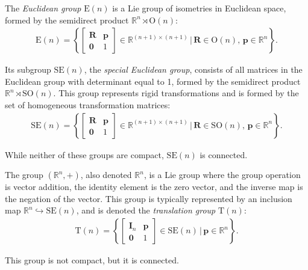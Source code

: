 \begin{example}\label{ex:euclidean-group-special-euclidean-group}
    The \emph{Euclidean group} $\text{E}(n)$ is a Lie group of isometries in Euclidean space, formed by the semidirect product $\mathbb{R}^n \rtimes \text{O}(n)$:
    \begin{align}
        \text{E}(n) = \left\{\begin{bmatrix}
            \mathbf{R} & \mathbf{p} \\ \mathbf{0} & 1
        \end{bmatrix} \in \mathbb{R}^{(n+1)\times(n+1)} \,\biggl|\, \mathbf{R}\in\text{O}(n),\, \mathbf{p}\in\mathbb{R}^n\right\}.
    \end{align}

    Its subgroup $\text{SE}(n)$, the \emph{special Euclidean group}, consists of all matrices in the Euclidean group with determinant equal to 1, formed by the semidirect product $\mathbb{R}^n\rtimes \text{SO}(n)$. This group represents rigid transformations and is formed by the set of homogeneous transformation matrices:
    \begin{align}
        \text{SE}(n) = \left\{\begin{bmatrix}
            \mathbf{R} & \mathbf{p} \\ \mathbf{0} & 1
        \end{bmatrix} \in \mathbb{R}^{(n+1)\times(n+1)} \,\biggl|\, \mathbf{R}\in\text{SO}(n),\, \mathbf{p}\in\mathbb{R}^n\right\}.
    \end{align}

    While neither of these groups are compact, $\text{SE}(n)$ is connected.
\end{example}
\begin{example}\label{ex:translation-group}
    The group $(\mathbb{R}^n,+)$, also denoted $\mathbb{R}^n$, is a Lie group where the group operation is vector addition, the identity element is the zero vector, and the inverse map is the negation of the vector. This group is typically represented by an inclusion map $\mathbb{R}^n \hookrightarrow \text{SE}(n)$, and is denoted the \emph{translation group} $\text{T}(n)$:
    \begin{align}
        \text{T}(n) = \left\{\begin{bmatrix}
            \mathbf{I}_n & \mathbf{p} \\ \mathbf{0} & 1
        \end{bmatrix} \in \text{SE}(n) \,\biggl|\, \mathbf{p}\in\mathbb{R}^n\right\}.
    \end{align}

    This group is not compact, but it is connected.
\end{example}
